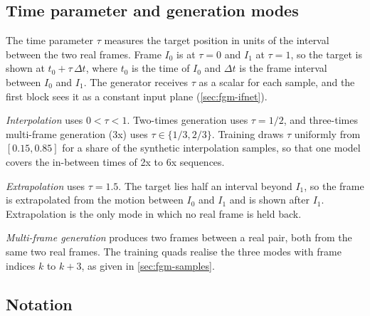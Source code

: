 \subsection{Time parameter and generation modes}\label{sec:fgm-time}

The time parameter $\tau$ measures the target position in units of the interval between the two real frames. Frame $I_0$ is at $\tau=0$ and $I_1$ at $\tau=1$, so the target is shown at $t_0+\tau\,\Delta t$, where $t_0$ is the time of $I_0$ and $\Delta t$ is the frame interval between $I_0$ and $I_1$. The generator receives $\tau$ as a scalar for each sample, and the first block sees it as a constant input plane (\cref{sec:fgm-ifnet}).

\emph{Interpolation} uses $0<\tau<1$. Two-times generation uses $\tau=1/2$, and three-times multi-frame generation (3x) uses $\tau\in\{1/3,2/3\}$. Training draws $\tau$ uniformly from $[0.15,0.85]$ for a share of the synthetic interpolation samples, so that one model covers the in-between times of 2x to 6x sequences.

\emph{Extrapolation} uses $\tau=1.5$. The target lies half an interval beyond $I_1$, so the frame is extrapolated from the motion between $I_0$ and $I_1$ and is shown after $I_1$. Extrapolation is the only mode in which no real frame is held back.

\emph{Multi-frame generation} produces two frames between a real pair, both from the same two real frames. The training quads realise the three modes with frame indices $k$ to $k+3$, as given in \cref{sec:fgm-samples}.

\subsection{Notation}\label{sec:fgm-notation}

